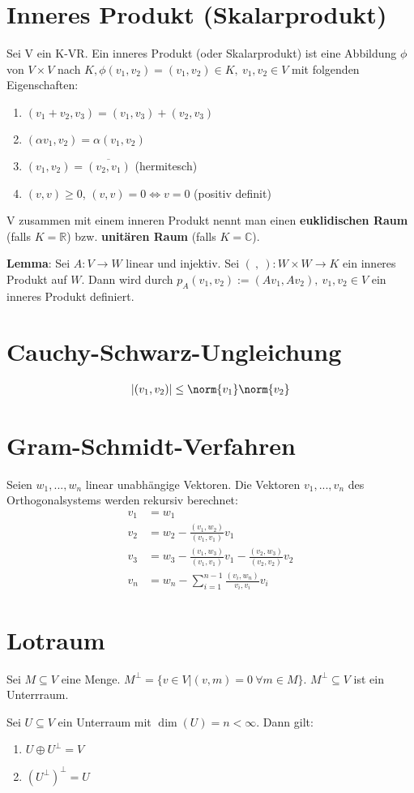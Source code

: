 \section{Inneres Produkt (Skalarprodukt)}
\begin{definition}
Sei V ein K-VR. Ein inneres Produkt (oder Skalarprodukt) ist eine Abbildung $\phi$ von $V \times V$ nach $K, \phi (v_1,v_2) = (v_1,v_2) \in K,~v_1,v_2 \in V$ mit folgenden Eigenschaften:
\begin{enumerate}
	\item $(v_1+v_2,v_3) = (v_1,v_3)+(v_2,v_3)$
	\item $(\alpha v_1,v_2) = \alpha (v_1,v_2)$
	\item $(v_1,v_2) = \overline{(v_2,v_1)}$ (hermitesch)
	\item $(v,v) \geq 0$, $(v,v) = 0 \Leftrightarrow v=0$ (positiv definit)
\end{enumerate}
\end{definition}
\begin{remark}
V zusammen mit einem inneren Produkt nennt man einen \textbf{euklidischen Raum} (falls $K=\mathbb{R}$) bzw. \textbf{unitären Raum} (falls $K=\mathbb{C}$).
\end{remark}
\textbf{Lemma}:
Sei $A:V \rightarrow W$ linear und injektiv. Sei $(~,~):W \times W \rightarrow K$ ein inneres Produkt auf $W$. Dann wird durch $p_A(v_1,v_2):=(Av_1,Av_2),~v_1,v_2 \in V$ ein inneres Produkt definiert.

\section{Cauchy-Schwarz-Ungleichung}
\begin{align*}
|(v_1,v_2)| \leq \norm{v_1} \norm{v_2}
\end{align*}

\section{Gram-Schmidt-Verfahren}
Seien $w_1,...,w_n$ linear unabhängige Vektoren. Die Vektoren $v_1,...,v_n$ des Orthogonalsystems werden rekursiv berechnet:
\begin{align*}
v_1 &= w_1\\
v_2 &= w_2 - \frac{(v_1,w_2)}{(v_1,v_1)}v_1\\
v_3 &= w_3 - \frac{(v_1,w_3)}{(v_1,v_1)}v_1 - \frac{(v_2,w_3)}{(v_2,v_2)}v_2\\
v_n &= w_n - \sum_{i=1}^{n-1}\frac{(v_i,w_n)}{v_i,v_i}v_i
\end{align*}

\section{Lotraum}
Sei $M \subseteq V$ eine Menge. $M^\perp = \{v\in V | (v,m)=0~\forall m \in M\}$. $M^\perp \subseteq V$ ist ein Unterrraum.

Sei $U \subseteq V$ ein Unterraum mit $\dim(U) = n < \infty$. Dann gilt:
\begin{enumerate}
	\item $U \oplus U^\perp = V$
	\item $(U^\perp)^\perp = U$
\end{enumerate}